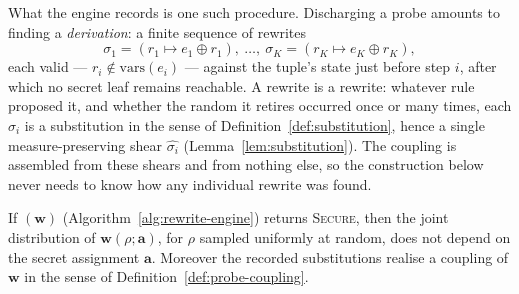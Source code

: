   What the engine records is one such procedure. Discharging a probe amounts to
  finding a \emph{derivation}: a finite sequence of rewrites
  \[
    \sigma_1 = (r_1 \mapsto e_1 \oplus r_1), \ \dots, \ \sigma_K = (r_K \mapsto e_K \oplus r_K),
  \]
  each valid --- $r_i \notin \mathrm{vars}(e_i)$ --- against the tuple's state
  just before step $i$, after which no secret leaf remains reachable. A rewrite
  is a rewrite: whatever rule proposed it, and whether the random it retires
  occurred once or many times, each $\sigma_i$ is a substitution in the sense of
  Definition~\ref{def:substitution}, hence a single measure-preserving shear
  $\widehat{\sigma_i}$ (Lemma~\ref{lem:substitution}). The coupling is assembled
  from these shears and from nothing else, so the construction below never needs
  to know how any individual rewrite was found.

  \begin{theorem}
  \label{thm:rewrite-soundness}
  If \textup{}$(\mathbf{w})$
  (Algorithm~\ref{alg:rewrite-engine}) returns \textup{\textsc{Secure}}, then the
  joint distribution of $\mathbf{w}(\rho; \mathbf{a})$, for $\rho$ sampled
  uniformly at random, does not depend on the secret assignment $\mathbf{a}$.
  Moreover the recorded substitutions realise a coupling of $\mathbf{w}$ in the
  sense of Definition~\ref{def:probe-coupling}.
  \end{theorem}

